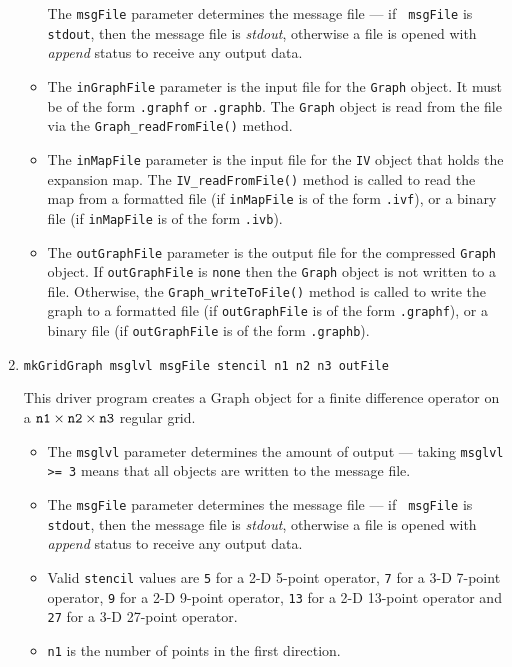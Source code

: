\begin{enumerate}
\begin{itemize}
The {\tt msgFile} parameter determines the message file --- if {\tt
msgFile} is {\tt stdout}, then the message file is {\it stdout},
otherwise a file is opened with {\it append} status to receive any
output data.
\item
The {\tt inGraphFile} parameter is the input file for the {\tt Graph}
object. It must be of the form {\tt *.graphf} or {\tt *.graphb}.
The {\tt Graph} object is read from the file via the
{\tt Graph\_readFromFile()} method.
\item
The {\tt inMapFile} parameter is the input file for the {\tt IV}
object that holds the expansion map.
The {\tt IV\_readFromFile()} method is called to read
the map from 
a formatted file (if {\tt inMapFile} is of the form {\tt *.ivf}),
or
a binary file (if {\tt inMapFile} is of the form {\tt *.ivb}).
\item
The {\tt outGraphFile} parameter is the output file for the 
compressed {\tt Graph} object. 
If {\tt outGraphFile} is {\tt none} then the {\tt Graph} object is not
written to a file. 
Otherwise, the {\tt Graph\_writeToFile()} method is called to write
the graph to 
a formatted file (if {\tt outGraphFile} is of the form {\tt *.graphf}),
or
a binary file (if {\tt outGraphFile} is of the form {\tt *.graphb}).
\end{itemize}
\item
\begin{verbatim}
mkGridGraph msglvl msgFile stencil n1 n2 n3 outFile 
\end{verbatim}
This driver program creates a Graph object for a finite difference
operator on a ${\tt n1} \times {\tt n2} \times {\tt n3}$ regular grid.
\begin{itemize}
\item
The {\tt msglvl} parameter determines the amount of output ---
taking {\tt msglvl >= 3} means that all objects are written
to the message file.
\item
The {\tt msgFile} parameter determines the message file --- if {\tt
msgFile} is {\tt stdout}, then the message file is {\it stdout},
otherwise a file is opened with {\it append} status to receive any
output data.
\item
Valid {\tt stencil} values are 
{\tt 5} for a 2-D 5-point operator,
{\tt 7} for a 3-D 7-point operator,
{\tt 9} for a 2-D 9-point operator,
{\tt 13} for a 2-D 13-point operator
and
{\tt 27} for a 3-D 27-point operator.
\item
{\tt n1} is the number of points in the first direction.

\end{itemize}
\end{enumerate}
